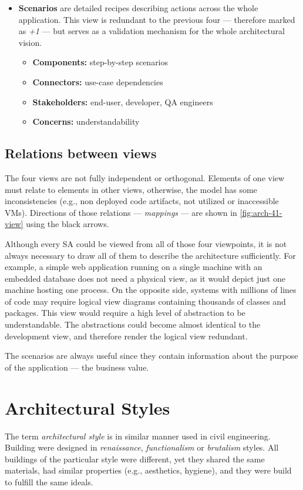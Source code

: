 \documentclass[thesis=M,english,hidelinks]{FITthesis}[2012/10/20]
\begin{document}
\begin{itemize}
    \item \textbf{Scenarios} are detailed recipes describing actions across the whole application. This view is redundant to the previous four --- therefore marked as \textit{+1} --- but serves as a validation mechanism for the whole architectural vision.
    \begin{itemize}
        \item \textbf{Components:} step-by-step scenarios
        \item \textbf{Connectors:} use-case dependencies
        \item \textbf{Stakeholders:} end-user, developer, QA engineers
        \item \textbf{Concerns:} understandability
    \end{itemize}
\end{itemize}

\subsection{Relations between views}
The four views are not fully independent or orthogonal. Elements of one view must relate to elements in other views, otherwise, the model has some inconsistencies (e.g., non deployed code artifacts, not utilized or inaccessible \acrshort{VM}s). Directions of those relations --- \textit{mappings} --- are shown in \ref{fig:arch-41-view} using the black arrows.

Although every \acrlong{SA} could be viewed from all of those four viewpoints, it is not always necessary to draw all of them to describe the architecture sufficiently. For example, a simple web application running on a single machine with an embedded database does not need a physical view, as it would depict just one machine hosting one process. On the opposite side, systems with millions of lines of code may require logical view diagrams containing thousands of classes and packages. This view would require a high level of abstraction to be understandable. The abstractions could become almost identical to the development view, and therefore render the logical view redundant.

The scenarios are always useful since they contain information about the purpose of the application --- the business value.

\section{Architectural Styles}
The term \textit{architectural style} is in similar manner used in civil engineering. Building were designed in \textit{renaissance}, \textit{functionalism} or \textit{brutalism} styles. All buildings of the particular style were different, yet they shared the same materials, had similar properties (e.g., aesthetics, hygiene), and they were build to fulfill the same ideals.
\end{document}
